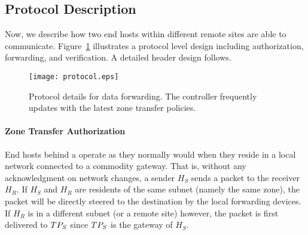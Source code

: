 


\subsection{Protocol Description}
\label{ssec:protocol}

Now, we describe how two end hosts within different remote sites are able to communicate. 
Figure~\ref{fig:protocol} illustrates a protocol level design including authorization,
forwarding, and verification. A detailed header design follows.

\begin{figure}[t]
\begin{center}
\texttt{[image: protocol.eps]}
\end{center}
\caption{Protocol details for data forwarding. The controller frequently updates \tps 
with the latest zone transfer policies.}
\label{fig:protocol}
\end{figure}


\paragraph{Zone Transfer Authorization}
End hosts behind a \tp operate as they normally would when they reside in a local network connected to a commodity gateway. That is, without any acknowledgment on network changes, a sender $H_S$ 
sends a packet to the receiver $H_R$. If $H_S$ and $H_R$ are residents of the same subnet 
(namely the same zone), the packet will be directly steered to the destination by the local 
forwarding devices. If $H_R$ is in a different subnet (or a remote site) however, the packet
is first delivered to $TP_S$ since $TP_S$ is the gateway of $H_S$. %


